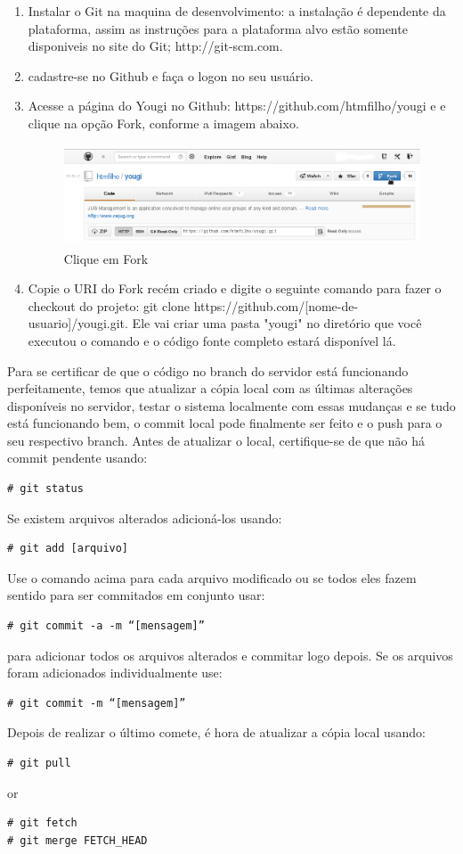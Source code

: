 \documentclass[envcountsame,envcountchap]{svmono}
\begin{document}
\begin{enumerate}
\item Instalar o Git na maquina de desenvolvimento: a instalação é dependente da plataforma, assim as instruções para a plataforma alvo estão somente disponiveis no site do Git; http://git-scm.com.
\item cadastre-se no Github e faça o logon no seu usuário.
\item Acesse a página do Yougi no Github: https://github.com/htmfilho/yougi e e clique na opção Fork, conforme a imagem abaixo.
\begin{figure}
\centering
\includegraphics[height=3cm, angle=0]{figures/fork-yougi-github}
\caption{Clique em Fork}
\label{fig:1}
\end{figure}
\item Copie o URI do Fork recém criado e digite o seguinte comando para fazer o checkout do projeto: git clone https://github.com/[nome-de-usuario]/yougi.git. Ele vai criar uma pasta "yougi" no diretório que você executou o comando e o código fonte completo estará disponível lá.
\end{enumerate}

Para se certificar de que o código no branch do servidor está funcionando perfeitamente, temos que atualizar a cópia local com as últimas alterações disponíveis no servidor, testar o sistema localmente com essas mudanças e se tudo está funcionando bem, o commit local pode finalmente ser feito e o push para o seu respectivo branch. Antes de atualizar o local, certifique-se de que não há commit pendente usando:
\begin{verbatim}
# git status
\end{verbatim}
Se existem arquivos alterados adicioná-los usando:
\begin{verbatim}
# git add [arquivo]
\end{verbatim}
Use o comando acima para cada arquivo modificado ou se todos eles fazem sentido para ser commitados em conjunto usar:
\begin{verbatim}
# git commit -a -m “[mensagem]”
\end{verbatim}
para adicionar todos os arquivos alterados e commitar logo depois. Se os arquivos foram adicionados individualmente use:
\begin{verbatim}
# git commit -m “[mensagem]”
\end{verbatim}
Depois de realizar o último comete, é hora de atualizar a cópia local usando:
\begin{verbatim}
# git pull
\end{verbatim}
or
\begin{verbatim}
# git fetch
# git merge FETCH_HEAD
\end{verbatim}
\end{document}
